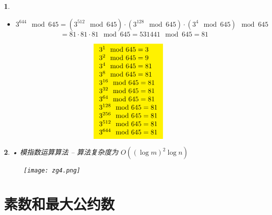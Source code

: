 \documentclass[UTF8]{report}
\theoremstyle{MyLineTheoremStyle} %
\theoremstyle{MyBlockTheoremStyle} %
\theoremstyle{MySubsubsectionStyle} %
\newtheorem{definition}{}
\begin{document}
\begin{definition}
\begin{itemize}
\[\begin{aligned}
                    3^{512} &\mod 645 = 81^2 \mod 645 = 6561 \mod 645 = 81 \\
                \end{aligned}
                \]
                \item $3^{644} \mod 645 = (3^{512} \mod 645) \cdot (3^{128} \mod 645) \cdot (3^4 \mod 645) \mod 645$
                \[
                = 81 \cdot 81 \cdot 81 \mod 645 = 531441 \mod 645 = 81
                \]
            \end{itemize}
            \[
            \colorbox{yellow}{$
                \begin{array}{l}
                    3^1 \mod 645 = 3 \\
                    3^2 \mod 645 = 9 \\
                    3^4 \mod 645 = 81 \\
                    3^8 \mod 645 = 81 \\
                    3^{16} \mod 645 = 81 \\
                    3^{32} \mod 645 = 81 \\
                    3^{64} \mod 645 = 81 \\
                    3^{128} \mod 645 = 81 \\
                    3^{256} \mod 645 = 81 \\
                    3^{512} \mod 645 = 81 \\
                    3^{644} \mod 645 = 81
                \end{array}
            $}
            \]
\end{definition}

\begin{definition}
• 模指数运算算法
– 算法复杂度为 $O((\log m)^2 \log n)$
\begin{figure}[ht]
    \centering
    \texttt{[image: zg4.png]}
\end{figure}
\end{definition}


\section{素数和最大公约数}
\end{document}
